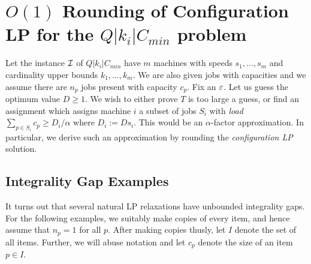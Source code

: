 \newcommand{\barcalS}{\bar{\cal S}\xspace}
\newcommand{\brt}{{(t)}}

\section{$O(1)$ Rounding of Configuration LP for the $Q|k_i|C_{min}$ problem}\label{sec:conf-round}
Let the instance ${\cal I}$ of $Q|k_i|C_{min}$ have $m$ machines with speeds $s_1,\ldots, s_m$ and cardinality upper bounds $k_1,\ldots,k_m$. We are also given jobs with capacities
and we assume there are $n_p$ jobs present with capacity $c_p$.
Fix an $\varepsilon$. 
Let us guess the optimum value $D\geq 1$.  We wish to either prove $T$ is too large a guess, or find an assignment which assigns machine $i$ a subset of jobs $S_i$ with {\em load} $\sum_{p\in S_i} c_p \geq D_i/\alpha$ where $D_i := Ds_i$.
This would be an $\alpha$-factor approximation. In particular, we derive such an approximation by rounding the {\em configuration LP} solution.

\iffalse
\subsection{Integrality Gap Examples}
It turns out that several natural LP relaxations have unbounded integrality gaps. For the following examples, we suitably make copies of every item, and hence assume that $n_p = 1$ for all $p$. After making copies thusly, let $I$ denote the set of all items. Further, we will abuse notation and let $c_p$ denote the
size of an item $p \in I$.

